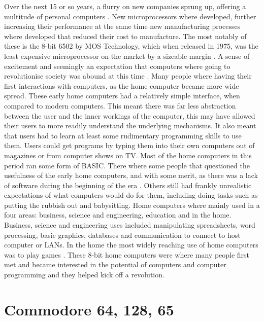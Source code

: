 Over the next 15 or so years, a flurry on new companies sprung up, offering a multitude of personal computers 
\cite{RN27}. New microprocessors where developed, further increasing their performance at the same time new manufacturing processes where developed that reduced their cost to manufacture. The most notably of these is the 8-bit 6502 by MOS Technology, which when released in 1975, was the least expensive microprocessor on the market by a sizeable margin 
\cite{RN40}. A sense of excitement and seemingly an expectation that computers where going to revolutionise society was abound at this time 
\cite{RN34}. Many people where having their first interactions with computers, as the home computer became more wide spread. These early home computers had a relatively simple interface, when compared to modern computers. This meant there was far less abstraction between the user and the inner workings of the computer, this may have allowed their users to more readily understand the underlying mechanisms. It also meant that users had to learn at least some rudimentary programming skills to use them. Users could get programs by typing them into their own computers out of magazines or from computer shows on TV. Most of the home computers in this period ran some form of BASIC. There where some people that questioned the usefulness of the early home computers, and with some merit, as there was a lack of software during the beginning of the era
\cite{RN23}. Others still had frankly unrealistic expectations of what computers would do for them, including doing tasks such as putting the rubbish out and babysitting. Home computers where mainly used in a four areas: business, science and engineering, education and in the home. Business, science and engineering uses included manipulating spreadsheets, word processing, basic graphics, databases and communication to connect to host computer or LANs. In the home the most widely reaching use of home computers was to play games 
\cite{RN24}. These 8-bit home computers were where many people first met and became interested in the potential of computers and computer programming and they helped kick off a revolution.


\section{Commodore 64, 128, 65}

